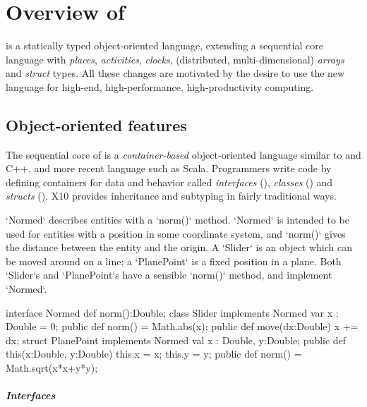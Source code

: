 \chapter{Overview of \Xten}

\Xten{} is a statically typed object-oriented language, extending a
sequential core language with
\emph{places}, \emph{activities}, \emph{clocks},
(distributed, multi-dimensional) \emph{arrays} and \emph{struct}
types. All these changes are motivated by the desire to use the new
language for high-end, high-performance, high-productivity computing.

\section{Object-oriented features}

The sequential core of \Xten{} is a {\em container-based} object-oriented language
similar to \java{} and C++, and more recent language such as Scala.  
Programmers write \Xten{} code by defining containers for data and behavior called
\emph{interfaces}
(),
\emph{classes}
() and
\emph{structs}
().
X10 provides inheritance and subtyping in fairly traditional ways. 

\begin{example}

\xcd`Normed` describes entities with a \xcd`norm()` method. \xcd`Normed` is
intended to be used for entities with a position in some coordinate system,
and \xcd`norm()` gives the distance between the entity and the origin. A
\xcd`Slider` is an object which can be moved around on a line; a
\xcd`PlanePoint` is a fixed position in a plane. Both \xcd`Slider`s and
\xcd`PlanePoint`s have a sensible \xcd`norm()` method, and implement
\xcd`Normed`.

\begin{xten}
interface Normed {
  def norm():Double;
}
class Slider implements Normed {
  var x : Double = 0;
  public def norm() = Math.abs(x);
  public def move(dx:Double) { x += dx; }
}
struct PlanePoint implements Normed {
  val x : Double, y:Double;
  public def this(x:Double, y:Double) {
    this.x = x; this.y = y;
  }
  public def norm() = Math.sqrt(x*x+y*y);
}
\end{xten}
%
\end{example}

\paragraph{Interfaces}

